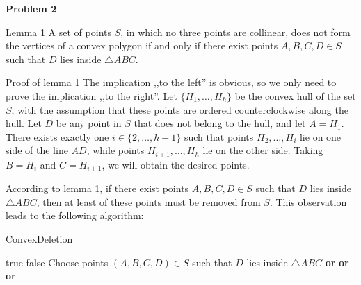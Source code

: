 \documentclass[12pt]{article}
\begin{document}
	\bigskip
	
	\textbf{Problem 2}
	
	\medskip
	
	\underline{Lemma 1} A set of points \(S\), in which no three points are
	collinear, does not form the vertices of a convex polygon if and only if
	there exist points \(A, B, C, D \in S\) such that \(D\) lies inside
	\(\triangle ABC\).
	
	\medskip
	
	\underline{Proof of lemma 1} The implication ,,to the left'' is obvious,
	so we only need to prove the implication ,,to the right''. Let \(\{H_{1},
	\ldots, H_{h}\}\) be the convex hull of the set \(S\), with the assumption
	that these points are ordered counterclockwise along the hull. Let \(D\) be
	any point in \(S\) that does not belong to the hull, and let \(A = H_{1}\).
	There exists exactly one \(i \in \{2, \ldots, h - 1\}\) such that points
	\(H_{2}, \ldots, H_{i}\) lie on one side of the line \(AD\), while points
	\(H_{i + 1}, \ldots, H_{h}\) lie on the other side. Taking \(B = H_{i}\) and
	\(C = H_{i + 1}\), we will obtain the desired points.
	
	\newpage
	
	According to lemma 1, if there exist points \(A, B, C, D \in S\) such that
	\(D\) lies inside \(\triangle ABC\), then at least of these points must be
	removed from \(S\). This observation leads to the following algorithm:
	
	\begin{algorithm}
		\caption{ConvexDeletion} \label{alg:alg1}
		\begin{algorithmic}[1]
			        \State \Return true
			    \EndIf
			        \State \Return false
			    \EndIf
			    \State Choose points $(A, B, C, D) \in S$ such that $D$ lies
			           inside $\triangle ABC$
			    \State \Return {}
			           \textbf{or}
			           \textbf{or}
			    \Statex \hspace{4.685em}
			           \textbf{or}
			\EndProcedure
		\end{algorithmic}
	\end{algorithm}
	
\end{document}
